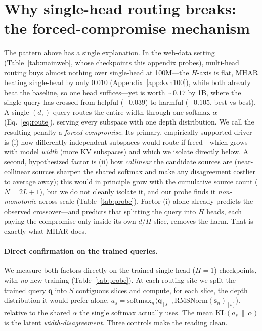 \documentclass{article}
\begin{document}
\section{Why single-head routing breaks: the forced-compromise mechanism}
\label{sec:mechanism}

The pattern above has a single explanation. In the web-data setting
(Table~\ref{tab:mainweb}, whose checkpoints this appendix probes), multi-head
routing buys almost nothing
over single-head at 100M---the $H$-axis is flat, MHAR beating single-head by only
$0.010$ (Appendix~\ref{app:kvh100}), while both already beat the baseline, so one
head suffices---yet is worth $\sim\!0.17$ by 1B, where the single query has crossed
from helpful ($-0.039$) to harmful ($+0.105$, best-vs-best). A single $(d,)$ query routes the
entire width through one softmax $\alpha$ (Eq.~\ref{eq:route}), serving every
subspace with one depth distribution. We call the resulting penalty a \emph{forced
compromise}. Its primary, empirically-supported driver is (i) how differently
independent subspaces would route if freed---which grows with model \emph{width}
(more KV subspaces) and which we isolate directly below. A second, hypothesized
factor is (ii) how \emph{collinear} the candidate sources are (near-collinear
sources sharpen the shared softmax and make any disagreement costlier to average
away); this would in principle grow with the cumulative source count
($N{=}2L{+}1$), but we do not cleanly isolate it, and our probe finds it
\emph{non-monotonic} across scale (Table~\ref{tab:probe}). Factor (i) alone already
predicts the observed crossover---and predicts that splitting the query into $H$
heads, each paying the compromise only inside its own $d/H$ slice, removes the
harm. That is exactly what MHAR does.

\paragraph{Direct confirmation on the trained queries.} We measure both factors
directly on the trained single-head ($H{=}1$) checkpoints, with \emph{no} new
training (Table~\ref{tab:probe}). At each routing site we split the trained query
$\mathbf{q}$ into $S$ contiguous slices and compute, for each slice, the depth
distribution it would prefer alone,
$a_s=\mathrm{softmax}_n\langle\mathbf{q}_{[s]},\mathrm{RMSNorm}(\mathbf{s}_n)_{[s]}\rangle$,
relative to the shared $\alpha$ the single softmax actually uses. The mean
$\mathrm{KL}(a_s\,\|\,\alpha)$ is the latent \emph{width-disagreement}. Three
controls make the reading clean.
\end{document}
